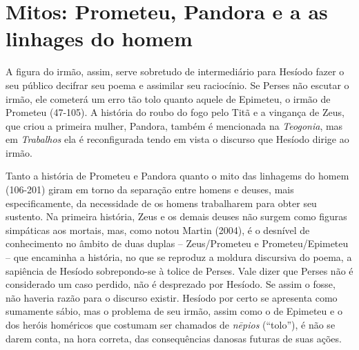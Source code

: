 \section{Mitos: Prometeu, Pandora e a as linhages do homem}

A figura do irmão, assim, serve sobretudo de intermediário para Hesíodo
fazer o seu público decifrar seu poema e assimilar seu raciocínio. Se
Perses não escutar o irmão, ele cometerá um erro tão tolo quanto aquele
de Epimeteu, o irmão de Prometeu (47-105). A história do roubo do fogo
pelo Titã e a vingança de Zeus, que criou a primeira mulher, Pandora,
também é mencionada na \emph{Teogonia}, mas em \emph{Trabalhos} ela é
reconfigurada tendo em vista o discurso que Hesíodo dirige ao irmão.

Tanto a história de Prometeu e Pandora quanto o mito das linhagems do
homem (106-201) giram em torno da separação entre homens e deuses, mais
especificamente, da necessidade de os homens trabalharem para obter seu
sustento. Na primeira história, Zeus e os demais deuses não surgem como
figuras simpáticas aos mortais, mas, como notou Martin (2004), é o
desnível de conhecimento no âmbito de duas duplas -- Zeus/Prometeu e
Prometeu/Epimeteu -- que encaminha a história, no que se reproduz a
moldura discursiva do poema, a sapiência de Hesíodo sobrepondo-se à
tolice de Perses. Vale dizer que Perses não é considerado um caso
perdido, não é desprezado por Hesíodo. Se assim o fosse, não haveria
razão para o discurso existir. Hesíodo por certo se apresenta como
sumamente sábio, mas o problema de seu irmão, assim como o de Epimeteu e
o dos heróis homéricos que costumam ser chamados de \emph{nēpios}
(``tolo''), é não se darem conta, na hora correta, das consequências
danosas futuras de suas ações.

